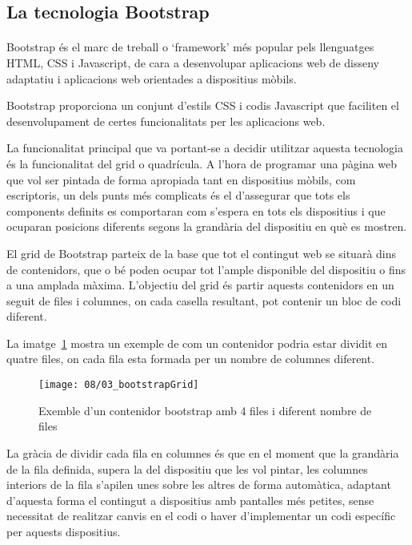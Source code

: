 \subsection{La tecnologia Bootstrap}

    \paragraph{}
    Bootstrap és el marc de treball o `framework' més popular pels llenguatges HTML, CSS i Javascript, de cara a desenvolupar aplicacions web de disseny adaptatiu i aplicacions web orientades a dispositius mòbils.

    Bootstrap proporciona un conjunt d'estils CSS i codis Javascript que faciliten el desenvolupament de certes funcionalitats per les aplicacions web.

    La funcionalitat principal que va portant-se a decidir utilitzar aquesta tecnologia és la funcionalitat del grid o quadrícula. A l'hora de programar una pàgina web que vol ser pintada de forma apropiada tant en dispositius mòbils, com escriptoris, un dels punts més complicats és el d'assegurar que tots els components definits es comportaran com s'espera en tots els dispositius i que ocuparan posicions diferents segons la grandària del dispositiu en què es mostren.

    El grid de Bootstrap parteix de la base que tot el contingut web se situarà dins de contenidors, que o bé poden ocupar tot l'ample disponible del dispositiu o fins a una amplada màxima. L’objectiu del grid és partir aquests contenidors en un seguit de files i columnes, on cada casella resultant, pot contenir un bloc de codi diferent.

    La imatge~\ref{img:gridSimple} mostra un exemple de com un contenidor podria estar dividit en quatre files, on cada fila esta formada per un nombre de columnes diferent.

    \begin{figure}[h]
        \texttt{[image: 08/03\_bootstrapGrid]}
        \centering
        \caption{Exemble d'un contenidor bootstrap amb 4 files i diferent nombre de files}\label{img:gridSimple}
    \end{figure}

    La gràcia de dividir cada fila en columnes és que en el moment que la grandària de la fila definida, supera la del dispositiu que les vol pintar, les columnes interiors de la fila s'apilen unes sobre les altres de forma automàtica, adaptant d'aquesta forma el contingut a dispositius amb pantalles més petites, sense necessitat de realitzar canvis en el codi o haver d'implementar un codi específic per aquests dispositius.

